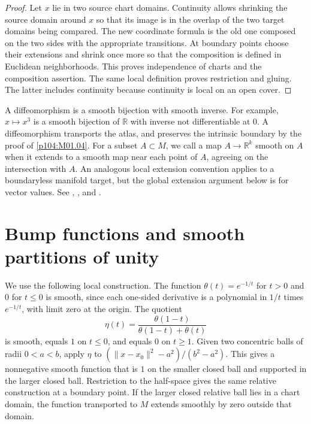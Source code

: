\documentclass[11pt,oneside,openany]{book}
\theoremstyle{definition}
\theoremstyle{remark}
\newcommand{\R}{\mathbb R}
\begin{document}
\begin{proof}
Let \(x\) lie in two source chart domains. Continuity allows shrinking
the source domain around \(x\) so that its image is in the overlap of
the two target domains being compared. The new coordinate formula is
the old one composed on the two sides with the appropriate
transitions. At boundary points choose their extensions and shrink
once more so that the composition is defined in Euclidean
neighborhoods. This proves independence of charts and the
composition assertion. The same local definition proves restriction
and gluing. The latter includes continuity because continuity is
local on an open cover.
\end{proof}

A diffeomorphism is a smooth bijection with smooth inverse.
For example, \(x\mapsto x^3\) is a smooth bijection of \(\R\) with
inverse not differentiable at \(0\). A diffeomorphism transports
the atlas, and preserves the intrinsic boundary by the proof of
\cref{p104:M01.04}. For a subset \(A\subset M\), we call
a map \(A\to\R^k\) smooth on \(A\) when it extends to a smooth
map near each point of \(A\), agreeing on the intersection with
\(A\). An analogous local extension convention applies to a
boundaryless manifold target, but the global extension argument
below is for vector values. See \cite[Chapter~2, especially p.~45]{lee},
\cite[p.~45]{leeerrata}, and \cite[Section~6]{tu}.

\section{Bump functions and smooth partitions of unity}

We use the following local construction. The function
\(\theta(t)=e^{-1/t}\) for \(t>0\) and \(0\) for \(t\leq0\)
is smooth, since each one-sided derivative is a polynomial in
\(1/t\) times \(e^{-1/t}\), with limit zero at the origin.
The quotient
\[
  \eta(t)=\frac{\theta(1-t)}{\theta(1-t)+\theta(t)}
\]
is smooth, equals \(1\) on \(t\leq0\), and equals \(0\) on
\(t\geq1\). Given two concentric balls of radii \(0<a<b\), apply
\(\eta\) to \((\|x-x_0\|^2-a^2)/(b^2-a^2)\).
This gives a nonnegative smooth function that is \(1\) on the
smaller closed ball and supported in the larger closed ball.
Restriction to the half-space gives the same relative construction
at a boundary point. If the larger closed relative ball lies in
a chart domain, the function transported to \(M\) extends
smoothly by zero outside that domain.
\end{document}

